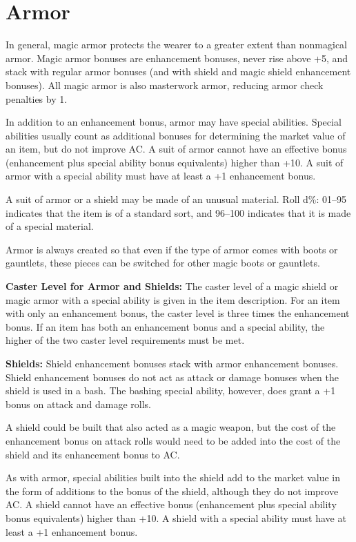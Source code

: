 \section{Armor}
In general, magic armor protects the wearer to a greater extent than nonmagical armor. Magic armor bonuses are enhancement bonuses, never rise above +5, and stack with regular armor bonuses (and with shield and magic shield enhancement bonuses). All magic armor is also masterwork armor, reducing armor check penalties by 1.

In addition to an enhancement bonus, armor may have special abilities. Special abilities usually count as additional bonuses for determining the market value of an item, but do not improve AC. A suit of armor cannot have an effective bonus (enhancement plus special ability bonus equivalents) higher than +10. A suit of armor with a special ability must have at least a +1 enhancement bonus.

A suit of armor or a shield may be made of an unusual material. Roll d\%: 01--95 indicates that the item is of a standard sort, and 96--100 indicates that it is made of a special material.

Armor is always created so that even if the type of armor comes with boots or gauntlets, these pieces can be switched for other magic boots or gauntlets.

\textbf{Caster Level for Armor and Shields:} The caster level of a magic shield or magic armor with a special ability is given in the item description. For an item with only an enhancement bonus, the caster level is three times the enhancement bonus. If an item has both an enhancement bonus and a special ability, the higher of the two caster level requirements must be met.

\textbf{Shields:} Shield enhancement bonuses stack with armor enhancement bonuses. Shield enhancement bonuses do not act as attack or damage bonuses when the shield is used in a bash. The bashing special ability, however, does grant a +1 bonus on attack and damage rolls.

A shield could be built that also acted as a magic weapon, but the cost of the enhancement bonus on attack rolls would need to be added into the cost of the shield and its enhancement bonus to AC.

As with armor, special abilities built into the shield add to the market value in the form of additions to the bonus of the shield, although they do not improve AC. A shield cannot have an effective bonus (enhancement plus special ability bonus equivalents) higher than +10. A shield with a special ability must have at least a +1 enhancement bonus.

